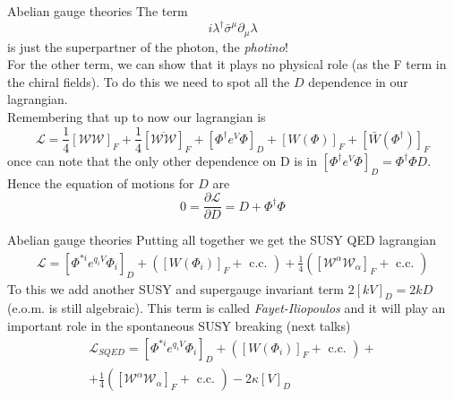 \documentclass[10pt]{beamer}
\begin{document}
\begin{frame}{Abelian gauge theories}
The term 
\begin{equation*}
    i\lambda^{\dagger} \bar\sigma^{\mu}\partial_{\mu} \lambda
\end{equation*}
is just the superpartner of the photon, the \emph{photino}! \\
For the other term, we can show that it plays no physical role (as the F term in the chiral fields). To do this we need to spot all the $D$ dependence in our lagrangian. \\
Remembering that up to now our lagrangian is 
\begin{equation*}
    \mathcal{L} = \frac{1}{4}\left[\mathcal{WW}\right]_F + \frac{1}{4} \left[\overline{\mathcal{WW}}\right]_F + \left[\Phi^{\dagger} e^V \Phi\right]_D + [W(\Phi)]_F + [\bar W(\Phi^{\dagger})]_F
\end{equation*}
once can note that the only other dependence on D is in $\left[\Phi^{\dagger} e^V \Phi \right]_D = \Phi^{\dagger}\Phi D$.
Hence the equation of motions for $D$ are
\begin{equation*}
    0 = \frac{\partial \mathcal{L}}{\partial D} = D + \Phi^{\dagger} \Phi 
\end{equation*}
\end{frame}

\begin{frame}{Abelian gauge theories}
Putting all together we get the SUSY QED lagrangian 
\begin{gather*}
    \mathcal{L}=\left[\Phi^{* i} e^{q_i V}{\Phi_{i}}\right]_{D}+\left(\left[W\left(\Phi_{i}\right)\right]_{F}+\text { c.c. }\right)+\frac{1}{4}\left(\left[\mathcal{W}^{\alpha} \mathcal{W}_{\alpha}\right]_{F}+\text { c.c. }\right)
\end{gather*}
To this we add another SUSY and supergauge invariant term $2[kV]_D = 2kD$ (e.o.m. is still algebraic). 
This term is called \emph{Fayet-Iliopoulos} and it will play an important role in the spontaneous SUSY breaking (next talks)
\begin{equation*}
    \boxed{
        \begin{gathered}
        \mathcal{L}_{SQED} = \left[\Phi^{* i} e^{q_{i} V} {\Phi_{i}}\right]_{D}+\left(\left[W\left(\Phi_{i}\right)\right]_{F}+\text { c.c. }\right)+ \\ 
        +\frac{1}{4}\left(\left[\mathcal{W}^{\alpha} \mathcal{W}_{\alpha}\right]_{F}+\text { c.c. }\right)-2 \kappa[V]_{D}
        \end{gathered}}
\end{equation*}
\end{frame}
\end{document}
